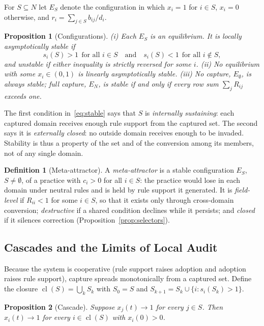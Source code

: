 \documentclass[letterpaper]{article} %
\newtheorem{proposition}{Proposition}
\theoremstyle{definition}
\newtheorem{definition}{Definition}
\newcommand{\cl}{\operatorname{cl}}
\begin{document}
For $S\subseteq N$ let $E_S$ denote the configuration in which $x_i=1$ for $i\in S$, $x_i=0$ otherwise, and $r_i=\sum_{j\in S}b_{ij}/d_i$.

\begin{proposition}[Configurations]\label{prop:config}
(i) Each $E_S$ is an equilibrium. It is locally asymptotically stable if
\begin{equation}\label{eq:stable}
s_i(S)>1\ \ \text{for all } i\in S\quad\text{and}\quad s_i(S)<1\ \ \text{for all } i\notin S,
\end{equation}
and unstable if either inequality is strictly reversed for some $i$. (ii) No equilibrium with some $x_i\in(0,1)$ is linearly asymptotically stable. (iii) No capture, $E_\emptyset$, is always stable; full capture, $E_N$, is stable if and only if every row sum $\sum_jR_{ij}$ exceeds one.
\end{proposition}

The first condition in~\eqref{eq:stable} says that $S$ is \emph{internally sustaining}: each captured domain receives enough rule support from the captured set. The second says it is \emph{externally closed}: no outside domain receives enough to be invaded. Stability is thus a property of the set and of the conversion among its members, not of any single domain.

\begin{definition}[Meta-attractor]\label{def:meta}
A \emph{meta-attractor} is a stable configuration $E_S$, $S\neq\emptyset$, of a practice with $c_i>0$ for all $i\in S$: the practice would lose in each domain under neutral rules and is held by rule support it generated. It is \emph{field-level} if $R_{ii}<1$ for some $i\in S$, so that it exists only through cross-domain conversion; \emph{destructive} if a shared condition declines while it persists; and \emph{closed} if it silences correction (Proposition~\ref{prop:selectors}).
\end{definition}

\subsection{Cascades and the Limits of Local Audit}

Because the system is cooperative (rule support raises adoption and adoption raises rule support), capture spreads monotonically from a captured set. Define the closure $\cl(S)=\bigcup_k S_k$ with $S_0=S$ and $S_{k+1}=S_k\cup\{i: s_i(S_k)>1\}$.

\begin{proposition}[Cascade]\label{prop:cascade}
Suppose $x_j(t)\to1$ for every $j\in S$. Then $x_i(t)\to1$ for every $i\in\cl(S)$ with $x_i(0)>0$.
\end{proposition}
\end{document}
